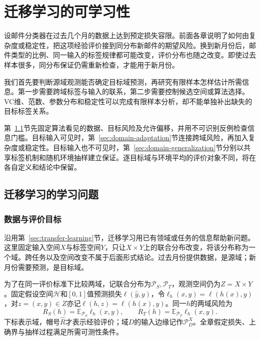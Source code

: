 \chapter{迁移学习的可学习性}
\label{chap:transfer-learning-theory}

设邮件分类器在过去几个月的数据上达到预定损失容限。前面各章说明了如何由复杂度或稳定性，把这项经验评价接到同分布新邮件的期望风险。换到新月份后，邮件类型的比例、同一输入的标签规律都可能改变，评价分布也随之改变。即使过去样本很多，同分布保证仍需重新检查，才能用于新月份。

我们首先要判断源域观测能否确定目标域预测，再研究有限样本怎样估计所需信息。第一步需要跨域标签与输入的联系，第二步需要控制候选空间或算法选择。VC维、范数、参数分布和稳定性可以完成有限样本分析，却不能单独补出缺失的目标标签关系。

第~\ref{sec:transfer-learning-setting}节先固定算法看见的数据、目标风险及允许偏移，并用不可识别反例检查信息门槛。目标输入可见时，第~\ref{sec:domain-adaptation}节连接跨域风险，再加入复杂度或稳定性。目标输入也不可见时，第~\ref{sec:domain-generalization}节分别以共享标签机制和随机环境抽样建立保证。逐目标域与环境平均的评价对象不同，将在各自定义和结论中保留。

\section{迁移学习的学习问题}
\label{sec:transfer-learning-setting}

\subsection{数据与评价目标}
\label{sec:adaptation-generalization-settings}

沿用第~\ref{sec:transfer-learning}节，迁移学习用已有领域或任务的信息帮助新问题。这里固定输入空间$X$与标签空间$Y$，只让$X\times Y$上的联合分布改变，将该分布称为一个域。跨任务以及空间改变不属于后面形式结论。过去月份提供数据，是源域；新月份需要预测，是目标域。

为了在同一评价标准下比较两域，记联合分布为$\mathcal P_S,\mathcal P_T$，观测空间仍为$Z=X\times Y$。固定假设空间$\mathcal H$和$[0,1]$值预测损失$\ell(\widehat y,y)$，令$\ell_h(x,y)=\ell(h(x),y)$，对$z=(x,y)\in Z$亦记$\ell(h,z)=\ell(h(x),y)$。同一$h$的两域风险为
\begin{equation}
 R_S(h)=\mathbb E_{\mathcal P_S}\ell_h(x,y),\qquad
 R_T(h)=\mathbb E_{\mathcal P_T}\ell_h(x,y).
 \label{eq:transfer-population-risks}
\end{equation}
下标表示域，帽号$\hat R$才表示经验评价；域$D$的输入边缘记作$\mathcal P_D^X$。全章假定损失、上确界与抽样过程满足所需可测性条件。

